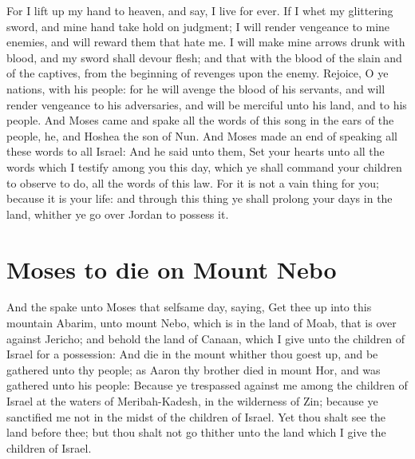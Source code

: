 \begin{biblechapter}
\verse For I lift up my hand to heaven, and say, I live for ever.
\verse If I whet my glittering sword, and mine hand take hold on judgment; I will render vengeance to mine enemies, and will reward them that hate me.
\verse I will make mine arrows drunk with blood, and my sword shall devour flesh; and that with the blood of the slain and of the captives, from the beginning of revenges upon the enemy.
\verse Rejoice, O ye nations, with his people: for he will avenge the blood of his servants, and will render vengeance to his adversaries, and will be merciful unto his land, and to his people.
\verse And Moses came and spake all the words of this song in the ears of the people, he, and Hoshea the son of Nun.
\verse And Moses made an end of speaking all these words to all Israel:
\verse And he said unto them, Set your hearts unto all the words which I testify among you this day, which ye shall command your children to observe to do, all the words of this law.
\verse For it is not a vain thing for you; because it is your life: and through this thing ye shall prolong your days in the land, whither ye go over Jordan to possess it.
\section*{Moses to die on Mount Nebo}
\verse And the \LORD spake unto Moses that selfsame day, saying,
\verse Get thee up into this mountain Abarim, unto mount Nebo, which is in the land of Moab, that is over against Jericho; and behold the land of Canaan, which I give unto the children of Israel for a possession:
\verse And die in the mount whither thou goest up, and be gathered unto thy people; as Aaron thy brother died in mount Hor, and was gathered unto his people:
\verse Because ye trespassed against me among the children of Israel at the waters of Meribah-Kadesh, in the wilderness of Zin; because ye sanctified me not in the midst of the children of Israel.
\verse Yet thou shalt see the land before thee; but thou shalt not go thither unto the land which I give the children of Israel.
\end{biblechapter}


